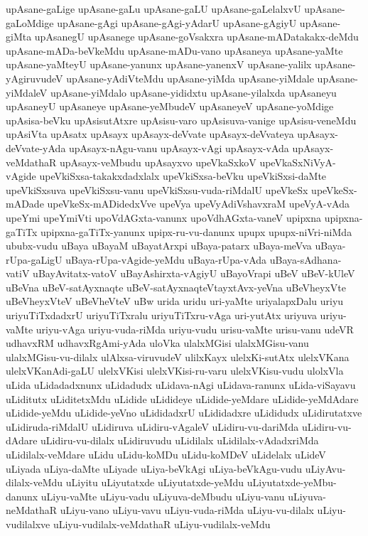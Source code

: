 {upAsane-gaLige
upAsane-gaLu
upAsane-gaLU
upAsane-gaLelalxvU
upAsane-gaLoMdige
upAsane-gAgi
upAsane-gAgi-yAdarU
upAsane-gAgiyU
upAsane-giMta
upAsanegU
upAsanege
upAsane-goVsakxra
upAsane-mADatakakx-deMdu
upAsane-mADa-beVkeMdu
upAsane-mADu-vano
upAsaneya
upAsane-yaMte
upAsane-yaMteyU
upAsane-yanunx
upAsane-yanenxV
upAsane-yalilx
upAsane-yAgiruvudeV
upAsane-yAdiVteMdu
upAsane-yiMda
upAsane-yiMdale
upAsane-yiMdaleV
upAsane-yiMdalo
upAsane-yididxtu
upAsane-yilalxda
upAsaneyu
upAsaneyU
upAsaneye
upAsane-yeMbudeV
upAsaneyeV
upAsane-yoMdige
upAsisa-beVku
upAsisutAtxre
upAsisu-varo
upAsisuva-vanige
upAsisu-veneMdu
upAsiVta
upAsatx
upAsayx
upAsayx-deVvate
upAsayx-deVvateya
upAsayx-deVvate-yAda
upAsayx-nAgu-vanu
upAsayx-vAgi
upAsayx-vAda
upAsayx-veMdathaR
upAsayx-veMbudu
upAsayxvo
upeVkaSxkoV
upeVkaSxNiVyA-vAgide
upeVkiSxsa-takakxdadxlalx
upeVkiSxsa-beVku
upeVkiSxsi-daMte
upeVkiSxsuva
upeVkiSxsu-vanu
upeVkiSxsu-vuda-riMdalU
upeVkeSx
upeVkeSx-mADade
upeVkeSx-mADidedxVve
upeVya
upeVyAdiVshavxraM
upeVyA-vAda
upeYmi
upeYmiVti
upoVdAGxta-vanunx
upoVdhAGxta-vaneV
upipxna
upipxna-gaTiTx
upipxna-gaTiTx-yanunx
upipx-ru-vu-danunx
upupx
upupx-niVri-niMda
ububx-vudu
uBaya
uBayaM
uBayatArxpi
uBaya-patarx
uBaya-meVva
uBaya-rUpa-gaLigU
uBaya-rUpa-vAgide-yeMdu
uBaya-rUpa-vAda
uBaya-sAdhana-vatiV
uBayAvitatx-vatoV
uBayAshirxta-vAgiyU
uBayoVrapi
uBeV
uBeV-kUleV
uBeVna
uBeV-satAyxnaqte
uBeV-satAyxnaqteVtayxtAvx-yeVna
uBeVheyxVte
uBeVheyxVteV
uBeVheVteV
uBw
urida
uridu
uri-yaMte
uriyalapxDalu
uriyu
uriyuTiTxdadxrU
uriyuTiTxralu
uriyuTiTxru-vAga
uri-yutAtx
uriyuva
uriyu-vaMte
uriyu-vAga
uriyu-vuda-riMda
uriyu-vudu
urisu-vaMte
urisu-vanu
udeVR
udhavxRM
udhavxRgAmi-yAda
uloVka
ulalxMGisi
ulalxMGisu-vanu
ulalxMGisu-vu-dilalx
ulAlxsa-viruvudeV
ulilxKayx
ulelxKi-sutAtx
ulelxVKana
ulelxVKanAdi-gaLU
ulelxVKisi
ulelxVKisi-ru-varu
ulelxVKisu-vudu
ulolxVla
uLida
uLidadadxnunx
uLidadudx
uLidava-nAgi
uLidava-ranunx
uLida-viSayavu
uLiditutx
uLiditetxMdu
uLidide
uLidideye
uLidide-yeMdare
uLidide-yeMdAdare
uLidide-yeMdu
uLidide-yeVno
uLididadxrU
uLididadxre
uLididudx
uLidirutatxve
uLidiruda-riMdalU
uLidiruva
uLidiru-vAgaleV
uLidiru-vu-dariMda
uLidiru-vu-dAdare
uLidiru-vu-dilalx
uLidiruvudu
uLidilalx
uLidilalx-vAdadxriMda
uLidilalx-veMdare
uLidu
uLidu-koMDu
uLidu-koMDeV
uLidelalx
uLideV
uLiyada
uLiya-daMte
uLiyade
uLiya-beVkAgi
uLiya-beVkAgu-vudu
uLiyAvu-dilalx-veMdu
uLiyitu
uLiyutatxde
uLiyutatxde-yeMdu
uLiyutatxde-yeMbu-danunx
uLiyu-vaMte
uLiyu-vadu
uLiyuva-deMbudu
uLiyu-vanu
uLiyuva-neMdathaR
uLiyu-vano
uLiyu-vavu
uLiyu-vuda-riMda
uLiyu-vu-dilalx
uLiyu-vudilalxve
uLiyu-vudilalx-veMdathaR
uLiyu-vudilalx-veMdu
}
